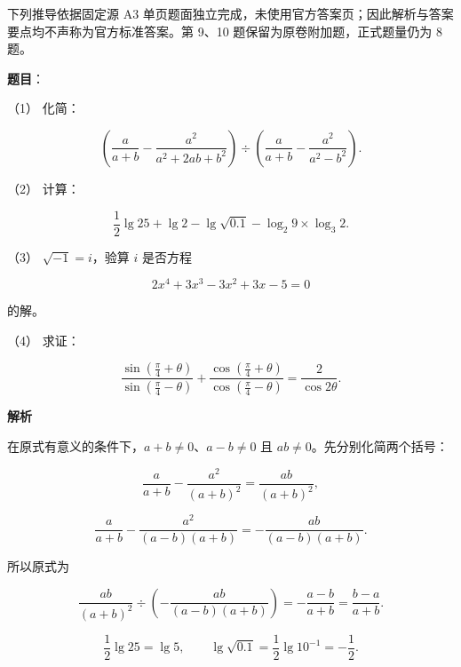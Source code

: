 

\begin{gktip}
下列推导依据固定源 A3 单页题面独立完成，未使用官方答案页；因此解析与答案要点均不声称为官方标准答案。第 9、10 题保留为原卷附加题，正式题量仍为 8 题。
\end{gktip}

\begin{answer}

\textbf{题目}：

（1） 化简：

\nopagebreak[4]
\[
\left(\frac{a}{a+b}-\frac{a^2}{a^2+2ab+b^2}\right)\div\left(\frac{a}{a+b}-\frac{a^2}{a^2-b^2}\right).
\]

（2） 计算：

\nopagebreak[4]
\[
\frac12\lg25+\lg2-\lg\sqrt{0.1}-\log_2 9\times\log_3 2.
\]

（3） $\sqrt{-1}=i$，验算 $i$ 是否方程

\nopagebreak[4]
\[
2x^4+3x^3-3x^2+3x-5=0
\]

的解。

（4） 求证：

\nopagebreak[4]
\[
\frac{\sin\left(\frac\pi4+\theta\right)}{\sin\left(\frac\pi4-\theta\right)}+\frac{\cos\left(\frac\pi4+\theta\right)}{\cos\left(\frac\pi4-\theta\right)}=\frac{2}{\cos2\theta}.
\]

\textbf{解析}


在原式有意义的条件下，$a+b\ne0$、$a-b\ne0$ 且 $ab\ne0$。先分别化简两个括号：

\nopagebreak[4]
\[
\frac{a}{a+b}-\frac{a^2}{(a+b)^2}=\frac{ab}{(a+b)^2},
\]

\nopagebreak[4]
\[
\frac{a}{a+b}-\frac{a^2}{(a-b)(a+b)}
=-\frac{ab}{(a-b)(a+b)}.
\]

所以原式为

\nopagebreak[4]
\[
\frac{ab}{(a+b)^2}\div\left(-\frac{ab}{(a-b)(a+b)}\right)
=-\frac{a-b}{a+b}=\frac{b-a}{a+b}.
\]


\nopagebreak[4]
\[
\frac12\lg25=\lg5,
\qquad
\lg\sqrt{0.1}=\frac12\lg10^{-1}=-\frac12.
\]


\end{answer}
